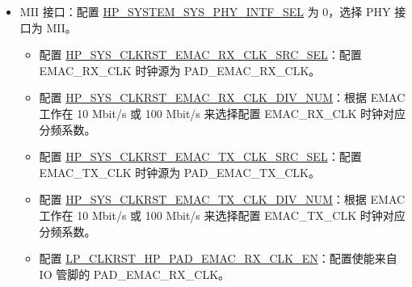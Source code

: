 \documentclass[main\_\_CN.tex]{subfiles}
\begin{document}
\begin{enumerate}
\begin{itemize}
\begin{itemize}
        \item 配置 \hyperref[regdesc:HPSYSCLKRSTPERICLKCTRL01REG]{HP\_SYS\_CLKRST\_EMAC\_RX\_CLK\_DIV\_NUM}：根据 EMAC 工作在 10 Mbit/s 或 100 Mbit/s 来选择配置 EMAC\_RX\_CLK 时钟对应分频系数。
        \item 配置 \hyperref[regdesc:HPSYSCLKRSTPERICLKCTRL01REG]{HP\_SYS\_CLKRST\_EMAC\_TX\_CLK\_SRC\_SEL}：配置 EMAC\_TX\_CLK 时钟源为 PAD\_EMAC\_TXRX\_CLK。
        \item 配置 \hyperref[regdesc:HPSYSCLKRSTPERICLKCTRL01REG]{HP\_SYS\_CLKRST\_EMAC\_TX\_CLK\_DIV\_NUM}：根据 EMAC 工作在 10 Mbit/s 或 100 Mbit/s 来选择配置 EMAC\_TX\_CLK 时钟对应分频系数。
        \item 配置 \hyperref[fielddesc:LPCLKRSTHPPADEMACTXRXCLKEN]{LP\_CLKRST\_HP\_PAD\_EMAC\_TXRX\_CLK\_EN}：配置使能来自 IO 管脚的 PAD\_EMAC\_TXRX\_CLK。
        \item 配置 \hyperref[regdesc:HPSYSCLKRSTSOCCLKCTRL1REG]{HP\_SYS\_CLKRST\_EMAC\_RMII\_CLK\_EN}：配置使能 EMAC\_RMII\_CLK。
        \item 配置 \hyperref[regdesc:HPSYSCLKRSTSOCCLKCTRL1REG]{HP\_SYS\_CLKRST\_EMAC\_RX\_CLK\_EN}：配置使能 EMAC\_RX\_CLK。
        \item 配置 \hyperref[regdesc:HPSYSCLKRSTPERICLKCTRL01REG]{HP\_SYS\_CLKRST\_EMAC\_TX\_CLK\_EN}：配置使能 EMAC\_TX\_CLK。
    \end{itemize}
\item MII 接口：配置 \hyperref[fielddesc:HPSYSTEMSYSPHYINTFSEL]{HP\_SYSTEM\_SYS\_PHY\_INTF\_SEL} 为 0，选择 PHY 接口为 MII。
    \begin{itemize}
        \item 配置 \hyperref[regdesc:HPSYSCLKRSTSOCCLKCTRL1REG]{HP\_SYS\_CLKRST\_EMAC\_RX\_CLK\_SRC\_SEL}：配置 EMAC\_RX\_CLK 时钟源为 PAD\_EMAC\_RX\_CLK。
        \item 配置 \hyperref[regdesc:HPSYSCLKRSTPERICLKCTRL01REG]{HP\_SYS\_CLKRST\_EMAC\_RX\_CLK\_DIV\_NUM}：根据 EMAC 工作在 10 Mbit/s 或 100 Mbit/s 来选择配置 EMAC\_RX\_CLK 时钟对应分频系数。
        \item 配置 \hyperref[regdesc:HPSYSCLKRSTPERICLKCTRL01REG]{HP\_SYS\_CLKRST\_EMAC\_TX\_CLK\_SRC\_SEL}：配置 EMAC\_TX\_CLK 时钟源为 PAD\_EMAC\_TX\_CLK。
        \item 配置 \hyperref[regdesc:HPSYSCLKRSTPERICLKCTRL01REG]{HP\_SYS\_CLKRST\_EMAC\_TX\_CLK\_DIV\_NUM}：根据 EMAC 工作在 10 Mbit/s 或 100 Mbit/s 来选择配置 EMAC\_TX\_CLK 时钟对应分频系数。
        \item 配置 \hyperref[fielddesc:LPCLKRSTHPPADEMACRXCLKEN]{LP\_CLKRST\_HP\_PAD\_EMAC\_RX\_CLK\_EN}：配置使能来自 IO 管脚的 PAD\_EMAC\_RX\_CLK。

\end{itemize}
\end{itemize}
\end{enumerate}
\end{document}
